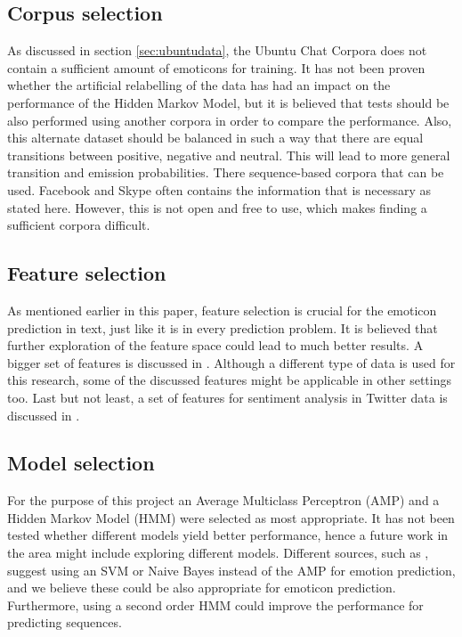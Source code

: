 \subsection{Corpus selection}
As discussed in section \ref{sec:ubuntudata}, the Ubuntu Chat Corpora does not contain a sufficient amount of emoticons for training. It has not been proven whether the artificial relabelling of the data has had an impact on the performance of the Hidden Markov Model, but it is believed that tests should be also performed using another corpora in order to compare the performance. Also, this alternate dataset should be balanced in such a way that there are equal transitions between positive, negative and neutral. This will lead to more general transition and emission probabilities. There sequence-based corpora that can be used. Facebook and Skype often contains the information that is necessary as stated here. However, this is not open and free to use, which makes finding a sufficient corpora difficult. %

\subsection{Feature selection}

As mentioned earlier in this paper, feature selection is crucial for the emoticon prediction in text, just like it is in every prediction problem. It is believed that further exploration of the feature space could lead to much better results. A bigger set of features is discussed in \cite{fairytales}. Although a different type of data is used for this research, some of the discussed features might be applicable in other settings too. Last but not least, a set of features for sentiment analysis in Twitter data is discussed in \cite{twittersentiment}.

\subsection{Model selection}

For the purpose of this project an Average Multiclass Perceptron (AMP) and a Hidden Markov Model (HMM) were selected as most appropriate. It has not been tested whether different models yield better performance, hence a future work in the area might include exploring different models. Different sources, such as \cite{emotionclassifiers}, suggest using an SVM or Naive Bayes instead of the AMP for emotion prediction, and we believe these could be also appropriate for emoticon prediction. Furthermore, using a second order HMM could improve the performance for predicting sequences.


